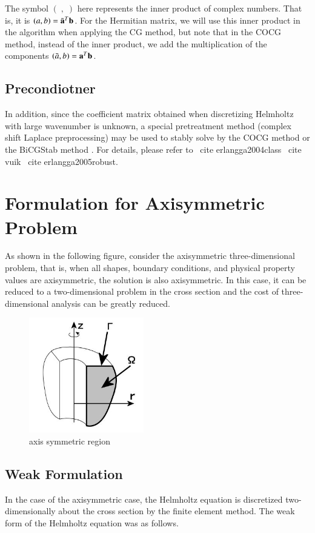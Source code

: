 The symbol $(\;,\;)$ here represents the inner product of complex numbers. That is, it is $(a,b)=\bar{\mathbf{a}}^T\mathbf{b}$. For the Hermitian matrix, we will use this inner product in the algorithm when applying the CG method, but note that in the COCG method, instead of the inner product, we add the multiplication of the components $(\bar{a},b)=\mathbf{a}^T\mathbf{b}$.

\subsection{Precondiotner}

In addition, since the coefficient matrix obtained when discretizing Helmholtz with large wavenumber is unknown, a special pretreatment method (complex shift Laplace preprocessing) may be used to stably solve by the COCG method or the BiCGStab method . For details, please refer to \ cite {erlangga2004class} \ cite {vuik} \ cite {erlangga2005robust}.

\section{Formulation for Axisymmetric Problem}
As shown in the following figure, consider the axisymmetric three-dimensional problem, that is, when all shapes, boundary conditions, and physical property values ​​are axisymmetric, the solution is also axisymmetric. In this case, it can be reduced to a two-dimensional problem in the cross section and the cost of three-dimensional analysis can be greatly reduced.

\begin{figure}[tbp]
\begin{center}
\includegraphics[bb=0 0 100 100,width=5cm]{images/cylinder_domain.jpg}
\caption{axis symmetric region}
\end{center}
\end{figure}


\subsection{Weak Formulation}
In the case of the axisymmetric case, the Helmholtz equation is discretized two-dimensionally about the cross section by the finite element method. The weak form of the Helmholtz equation was as follows.

